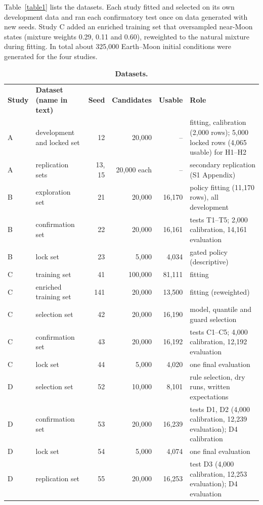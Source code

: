 \documentclass[10pt,letterpaper]{article}
\newlength\savedwidth
\newcommand\thickhline{\noalign{\global\savedwidth\arrayrulewidth\global\arrayrulewidth 2pt}%
\hline
\noalign{\global\arrayrulewidth\savedwidth}}
\begin{document}
Table~\ref{table1} lists the datasets. Each study fitted and selected on its own development data and ran each confirmatory test once on data generated with new seeds. Study C added an enriched training set that oversampled near-Moon states (mixture weights 0.29, 0.11 and 0.60), reweighted to the natural mixture during fitting. In total about 325,000 Earth--Moon initial conditions were generated for the four studies.

\begin{table}[!ht]
\centering
\caption{{\bf Datasets.}}
\small
\begin{tabular}{|l|L{1.3in}|r|r|r|L{1.95in}|}
\hline
\textbf{Study} & \textbf{Dataset (name in text)} & \textbf{Seed} & \textbf{Candidates} & \textbf{Usable} & \textbf{Role} \\ \thickhline
A & development and locked set & 12 & 20,000 & -- & fitting, calibration (2,000 rows); 5,000 locked rows (4,065 usable) for H1--H2 \\ \hline
A & replication sets & 13, 15 & 20,000 each & -- & secondary replication (S1 Appendix) \\ \hline
B & exploration set & 21 & 20,000 & 16,170 & policy fitting (11,170 rows), all development \\ \hline
B & confirmation set & 22 & 20,000 & 16,161 & tests T1--T5; 2,000 calibration, 14,161 evaluation \\ \hline
B & lock set & 23 & 5,000 & 4,034 & gated policy (descriptive) \\ \hline
C & training set & 41 & 100,000 & 81,111 & fitting \\ \hline
C & enriched training set & 141 & 20,000 & 13,500 & fitting (reweighted) \\ \hline
C & selection set & 42 & 20,000 & 16,190 & model, quantile and guard selection \\ \hline
C & confirmation set & 43 & 20,000 & 16,192 & tests C1--C5; 4,000 calibration, 12,192 evaluation \\ \hline
C & lock set & 44 & 5,000 & 4,020 & one final evaluation \\ \hline
D & selection set & 52 & 10,000 & 8,101 & rule selection, dry runs, written expectations \\ \hline
D & confirmation set & 53 & 20,000 & 16,239 & tests D1, D2 (4,000 calibration, 12,239 evaluation); D4 calibration \\ \hline
D & lock set & 54 & 5,000 & 4,074 & one final evaluation \\ \hline
D & replication set & 55 & 20,000 & 16,253 & test D3 (4,000 calibration, 12,253 evaluation); D4 evaluation \\ \hline

\end{tabular}
\end{table}
\end{document}
